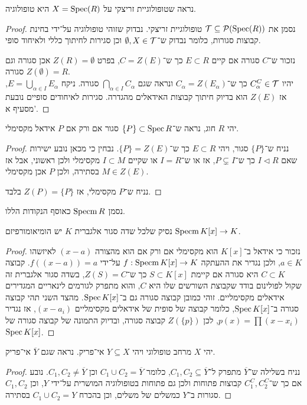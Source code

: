 \subquestion{}
נראה שטופולוגיית זריצקי על $X = \operatorname{Spec}(R)$ היא טופולוגיה.
\begin{proof}
	נסמן את $\mathcal{T} \subseteq \mathcal{P}(\operatorname{Spec}(R))$ טופולוגיית זריצקי.
	נבדוק שזוהי טופולוגיה על־ידי בחינת קבוצות סגורות, כלומר נבדוק ש־$\emptyset, X \in \mathcal{T}$ וכן סגירות לחיתוך כללי ולאיחוד סופי.

	נזכור ש־$C$ סגורה אם קיים $E \subset R$ כך ש־$C = Z(E)$, בפרט $Z(R) = \emptyset$ אכן סגורה וגם $Z(\emptyset) = R$ סגורה. \\
	יהיו $C_{\alpha}^C \in \mathcal{T}$ כך ש־$C_{\alpha} = Z(E_{\alpha})$ ונראה שגם $\bigcap_{\alpha \in I} C_{\alpha}$ סגורה.
	ניקח $E = \bigcup_{\alpha \in I} E_{\alpha}$, אז $Z(E)$ הוא בדיוק חיתוך קבוצות האידאלים מהגדרה.
	סגירות לאיחודים סופיים נובעת מסעיף א'.
\end{proof}

\question{}
\subquestion{}
יהי $R$ חוג, נראה ש־$\{ P \} \subset \operatorname{Spec} R$ סגור אם ורק אם $P$ אידאל מקסימלי.
\begin{proof}
	נניח ש־$\{ P \}$ סגור, ויהי $E \subset R$ כך ש־$\{ P \} = Z(E)$.
	נבחין כי מכאן נובע ישירות שאם $I \triangleleft R$ כך ש־$P \subsetneq I$, אז או ש־$I = R$ או שקיים $I \subset M$ מקסימלי ולכן ראשוני, אבל אז $M \in Z(E)$ בסתירה, ולכן $P$ אכן מקסימלי.

	נניח ש־$P$ מקסימלי, אז $Z(P) = \{ P \}$ בלבד.
\end{proof}
נסמן $\operatorname{Specm} R$ כאוסף הנקודות הללו.

\subquestion{}
נסיק שלכל שדה סגור אלגברית $K$ יש הומיאומורפיזם $\operatorname{Specm} K[x] \to K$.
\begin{proof}
	נזכור כי אידאל ב־$K[x]$ הוא מקסימלי אם ורק אם הוא מהצורה $(x - a)$ לאיזשהו $a \in K$, ולכן נגדיר את ההעתקה $f : \operatorname{Specm} K[x] \to K$ על־ידי $f((x - a)) = a$.
	קבוצה $C \subset K$ היא סגורה אם קיימת $S \subset K[x]$ כך ש־$Z(S) = C$, בשדה סגור אלגברית זה שקול לפולינום בודד שקבוצת השורשים שלו היא $C$, והוא מתפרק לגורמים לינאריים המגדירים אידאלים מקסימליים.
	זוהי כמובן קבוצה סגורה גם ב־$\operatorname{Spec} K[x]$.
	מהצד השני תהי קבוצה סגורה ב־$\operatorname{Spec} K[x]$, כלומר קבוצה של סופית של אידאלים מקסימליים $(x - a_i)$, אז נגדיר $p(x) = \prod (x - x_i)$, לכן $Z(\{ p \})$ קבוצה סגורה, ובדיוק התמונה של קבוצה סגורה של $\operatorname{Spec} K[x]$.
\end{proof}

\question{}
יהי $X$ מרחב טופולוגי ויהי $Y \subseteq X$ אי־פריק.
נראה שגם $\overline{Y}$ אי־פריק.
\begin{proof}
	נניח בשלילה ש־$\overline{Y}$ מתפרק ל־$C_1, C_2 \subseteq \overline{Y}$, כלומר $C_1 \cup C_2 = \overline{Y}$ וכן $C_1, C_2 \ne \overline{Y}$.
	נובע אם כך ש־$C_1^C, C_2^C$ קבוצות פתוחות ולכן גם פתוחות בטופולוגיה המושרית על־ידי $Y$, וכן $C_1, C_2$ סגורות ב־$Y$ כמשלים של משלים, וכן בהכרח $C_1 \cup C_2 = Y$ בסתירה.
\end{proof}

